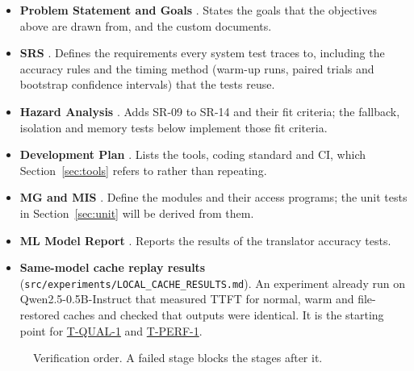 \documentclass[12pt, titlepage]{article}
\newcommand{\tref}[1]{\hyperref[test:#1]{#1}}
\begin{document}
\begin{itemize}
  \item \textbf{Problem Statement and Goals}
  \citep{TandemProblemStatement}. States the goals that the objectives
  above are drawn from, and the custom documents.
  \item \textbf{SRS} \citep{TandemSRS}. Defines the requirements every
  system test traces to, including the accuracy rules and the timing method
  (warm-up runs, paired trials and bootstrap confidence intervals) that the
  tests reuse.
  \item \textbf{Hazard Analysis} \citep{TandemHA}. Adds SR-09 to SR-14 and
  their fit criteria; the fallback, isolation and memory tests below
  implement those fit criteria.
  \item \textbf{Development Plan} \citep{TandemDevPlan}. Lists the tools,
  coding standard and CI, which Section~\ref{sec:tools} refers to rather
  than repeating.
  \item \textbf{MG and MIS} \citep{TandemMG, TandemMIS}. Define the modules and
  their access programs; the unit tests in Section~\ref{sec:unit} will be
  derived from them.
  \item \textbf{ML Model Report} \citep{TandemMLReport}. Reports the results
  of the translator accuracy tests.
  \item \textbf{Same-model cache replay results}
  (\texttt{src/experiments/LOCAL\_CACHE\_RESULTS.md}). An experiment
  already run on Qwen2.5-0.5B-Instruct that measured TTFT for normal, warm
  and file-restored caches and checked that outputs were identical. It is
  the starting point for \tref{T-QUAL-1} and \tref{T-PERF-1}.
\end{itemize}

\begin{figure}[ht]
\centering
{}
\caption{Verification order. A failed stage blocks the stages after it.}
\label{fig:gates}
\end{figure}
\end{document}
